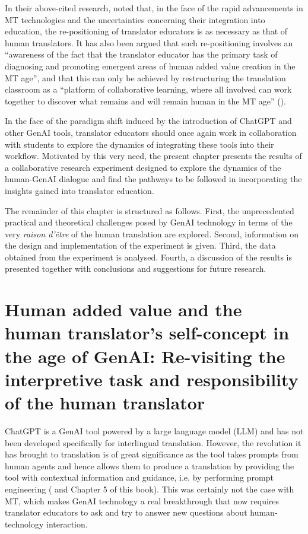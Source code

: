 \documentclass[output=paper,colorlinks,citecolor=brown]{langscibook}
\begin{document}
In their above-cited research, \citet[389]{SenemMilufer2023} noted that, in the face of the rapid advancements in MT technologies and the uncertainties concerning their integration into education, the re-positioning of translator educators is as necessary as that of human translators. It has also been argued that such re-positioning involves an “awareness of the fact that the translator educator has the primary task of diagnosing and promoting emergent areas of human added value creation in the MT age”, and that this can only be achieved by restructuring the translation classroom as a “platform of collaborative learning, where all involved can work together to discover what remains and will remain human in the MT age” (\cite[389]{SenemMilufer2023}).

In the face of the paradigm shift induced by the introduction of  ChatGPT and other GenAI tools, translator educators should once again work in collaboration with students to explore the dynamics of integrating these tools into their workflow. Motivated by this very need, the present chapter presents the results of a collaborative research experiment designed to explore the dynamics of the human-GenAI dialogue and find the pathways to be followed in incorporating the insights gained into translator education.

The remainder of this chapter is structured as follows. First, the unprecedented practical and theoretical challenges posed by GenAI technology in terms of the very \textit{raison d’être} of the human translation are explored. Second, information on the design and implementation of the experiment is given. Third, the data obtained from the experiment is analysed. Fourth, a discussion of the results is presented together with conclusions and suggestions for future research.

\section{Human added value and the human translator’s self-concept in the age of GenAI: Re-visiting the interpretive task and responsibility of the human translator
}
ChatGPT is a GenAI tool powered by a large language model (LLM) and has not been developed specifically for interlingual translation. However, the revolution it has brought to translation is of great significance as the tool takes prompts from human agents and hence allows them to produce a translation by providing the tool with contextual information and guidance, i.e. by performing prompt engineering (\cite{yamada-2023-optimizing} and Chapter 5 of this book). This was certainly not the case with MT, which makes GenAI technology a real breakthrough that now requires translator educators to ask and try to answer new questions about human-technology interaction.
\end{document}
